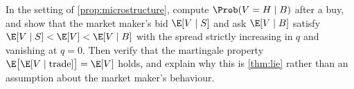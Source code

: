 \begin{exercise}\label{ex:prob-3}
	In the setting of \autoref{prop:microstructure}, compute
	$\Prob(V=H\mid B)$ after a buy, and show that the market maker's bid
	$\E[V\mid S]$ and ask $\E[V\mid B]$ satisfy
	$\E[V\mid S]<\E[V]<\E[V\mid B]$ with the spread strictly increasing in $q$
	and vanishing at $q=0$. Then verify that the martingale property
	$\E\bigl[\E[V\mid\text{trade}]\bigr]=\E[V]$ holds, and explain why this is
	\autoref{thm:lie} rather than an assumption about the market maker's behaviour.
\end{exercise}
